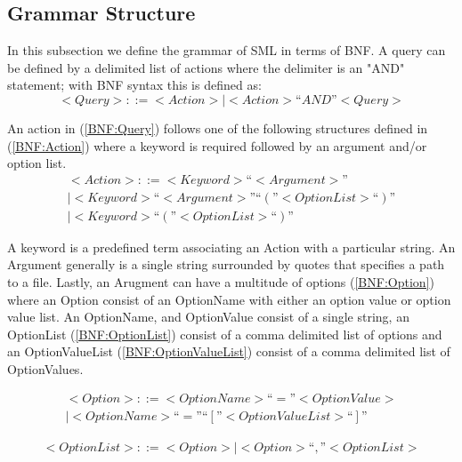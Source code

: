 \documentclass[jair,twoside,11pt,theapa]{article}
\begin{document}
\subsection{Grammar Structure}
In this subsection we define the grammar of SML in terms of BNF. A query can be defined by a delimited list of actions where the delimiter is an "AND" statement; with BNF syntax this is defined as:
\begin{equation} \label{BNF:Query}
<Query> ::= <Action> | <Action> “AND” <Query>
\end{equation}

An action in (\ref{BNF:Query}) follows one of the following structures defined in (\ref{BNF:Action}) where a keyword is required followed by an argument and/or option list.
\begin{equation} \label{BNF:Action}
\begin{split}
<Action> ::= <Keyword> “<Argument>” \\
| <Keyword> “<Argument>” “(”<Option List>“)” \\
| <Keyword> “(”<Option List>“)”
\end{split}
\end{equation}

A keyword is a predefined term associating an Action with a particular string. An Argument generally is a single string surrounded by quotes that specifies a path to a file. Lastly, an Arugment can have a multitude of options (\ref{BNF:Option}) where an Option consist of an OptionName with either an option value or option value list. An OptionName, and OptionValue consist of a single string, an OptionList (\ref{BNF:OptionList}) consist of a comma delimited list of options and an OptionValueList (\ref{BNF:OptionValueList}) consist of a comma delimited list of OptionValues.

\begin{equation} \label{BNF:Option}
\begin{split}
<Option> ::= <Option Name> “=” <Option Value> \\
		| <Option Name> “=” “[”<Option Value List>“]”
\end{split}
\end{equation}

\begin{equation} \label{BNF:OptionList}
\begin{split}
	<Option List> ::= <Option> | <Option> “,” <Option List>
\end{split}
\end{equation}
\end{document}
